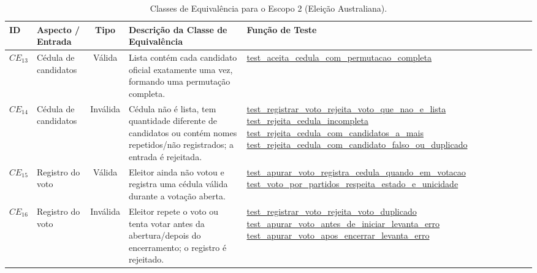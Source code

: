 \documentclass[12pt,a4paper]{article}
\begin{document}
\small
\begin{xltabular}{\textwidth}{|l|Y|c|Y|Y|}

\caption{Classes de Equivalência para o Escopo 2 (Eleição Australiana).}
\label{tab:escopo2} \\

\hline
{}
\textbf{ID} & \textbf{Aspecto / Entrada} & \textbf{Tipo} &
\textbf{Descrição da Classe de Equivalência} &
\textbf{Função de Teste} \\ \hline

$CE_{13}$ & Cédula de candidatos & Válida &
Lista contém cada candidato oficial exatamente uma vez, formando uma permutação completa. &
\url{test\_aceita\_cedula\_com\_permutacao\_completa} \\ \hline

$CE_{14}$ & Cédula de candidatos & Inválida &
Cédula não é lista, tem quantidade diferente de candidatos ou contém nomes repetidos/não registrados; a entrada é rejeitada. &
\url{test_registrar_voto_rejeita_voto_que_nao_e_lista}
\newline
\newline
\url{test_rejeita_cedula_incompleta}
\newline
\newline
\url{test_rejeita_cedula_com_candidatos_a_mais}
\newline
\newline
\url{test_rejeita_cedula_com_candidato_falso_ou_duplicado}
\\ \hline

$CE_{15}$ & Registro do voto & Válida &
Eleitor ainda não votou e registra uma cédula válida durante a votação aberta. &
\url{test\_apurar\_voto\_registra\_cedula\_quando\_em\_votacao}
\newline
\newline
\url{test\_voto\_por\_partidos\_respeita\_estado\_e\_unicidade} \\ \hline

$CE_{16}$ & Registro do voto & Inválida &
Eleitor repete o voto ou tenta votar antes da abertura/depois do encerramento; o registro é rejeitado. &
\url{test\_registrar\_voto\_rejeita\_voto\_duplicado}
\newline
\newline
\url{test\_apurar\_voto\_antes\_de\_iniciar\_levanta\_erro}
\newline
\newline
\url{test\_apurar\_voto\_apos\_encerrar\_levanta\_erro} \\ \hline


\end{xltabular}
\end{document}
